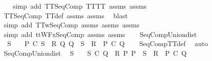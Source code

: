 \begin{isabellebody}
\ \ \isamarkupfalse%
\ {\isacharparenleft}simp\ add{\isacharcolon}\ TT{}{\isacharunderscore}SeqComp\ TT{\isacharunderscore}TT{}\ assms{\isacharparenleft}{}{\isacharparenright}\ assms{\isacharparenleft}{}{\isacharparenright}{\isacharparenright}\isanewline
\ \ \isamarkupfalse%
\ TT{}{\isacharunderscore}SeqComp\ TT{\isacharunderscore}def\ assms{\isacharparenleft}{}{\isacharparenright}\ assms{\isacharparenleft}{}{\isacharparenright}\ \isamarkupfalse%
\ blast\isanewline
\ \ \isamarkupfalse%
\ {\isacharparenleft}simp\ add{\isacharcolon}\ TT{}w{\isacharunderscore}SeqComp\ assms{\isacharparenleft}{}{\isacharparenright}\ assms{\isacharparenleft}{}{\isacharparenright}\ assms{\isacharparenleft}{}{\isacharparenright}{\isacharparenright}\isanewline
\ \ \isamarkupfalse%
\ {\isacharparenleft}simp\ add{\isacharcolon}\ ttWFx{\isacharunderscore}SeqComp\ assms{\isacharparenleft}{}{\isacharparenright}\ assms{\isacharparenleft}{}{\isacharparenright}{\isacharparenright}\isanewline
\ \ \isamarkupfalse%
%
\endisatagproof
{\isafoldproof}%
%
\isadelimproof
\isanewline
%
\endisadelimproof
\isanewline
{}\isamarkupfalse%
\ SeqComp{\isacharunderscore}Union{\isacharunderscore}dist{}{\isacharcolon}\isanewline
\ \ {\isachardoublequoteopen}S\ {\isasymnoteq}\ {\isacharbraceleft}{\isacharbraceright}\ {\isasymLongrightarrow}\ P\ {\isacharsemicolon}\isactrlsub C\ {\isacharparenleft}{\isasymUnion}S{\isacharparenright}\ {\isacharequal}\ {\isasymUnion}{\isacharbraceleft}R{\isachardot}\ {\isasymexists}Q{\isachardot}\ Q\ {\isasymin}\ S\ {\isasymand}\ R\ {\isacharequal}\ P\ {\isacharsemicolon}\isactrlsub C\ Q{\isacharbraceright}{\isachardoublequoteclose}\isanewline
%
\isadelimproof
\ \ %
\endisadelimproof
%
\isatagproof
{}\isamarkupfalse%
\ SeqCompTT{\isacharunderscore}def\ \isamarkupfalse%
\ auto%
\endisatagproof
{\isafoldproof}%
%
\isadelimproof
\isanewline
%
\endisadelimproof
\isanewline
{}\isamarkupfalse%
\ SeqComp{\isacharunderscore}Union{\isacharunderscore}dist{}{\isacharcolon}\isanewline
\ \ {\isachardoublequoteopen}S\ {\isasymnoteq}\ {\isacharbraceleft}{\isacharbraceright}\ {\isasymLongrightarrow}\ {\isacharparenleft}{\isasymUnion}S{\isacharparenright}\ {\isacharsemicolon}\isactrlsub C\ Q\ {\isacharequal}\ {\isasymUnion}{\isacharbraceleft}R{\isachardot}\ {\isasymexists}P{\isachardot}\ P\ {\isasymin}\ S\ {\isasymand}\ R\ {\isacharequal}\ P\ {\isacharsemicolon}\isactrlsub C\ Q{\isacharbraceright}{\isachardoublequoteclose}\isanewline

\end{isabellebody}
